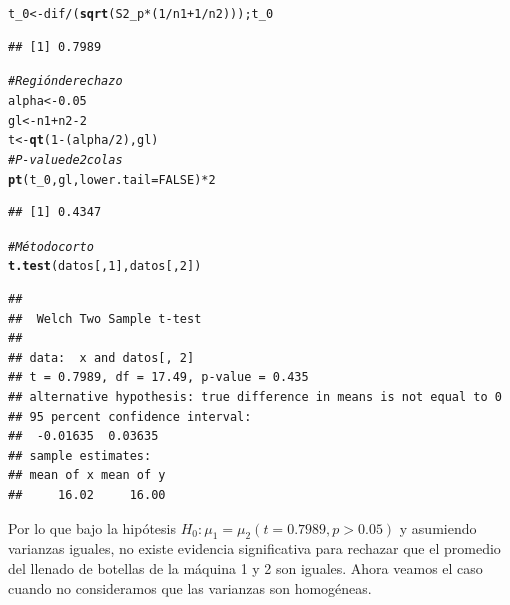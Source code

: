 \documentclass[a4paper]{scrartcl}\usepackage[]{graphicx}\usepackage[]{color}
\makeatletter
\newcommand{\hlnum}[1]{\textcolor[rgb]{0.686,0.059,0.569}{#1}}%
\newcommand{\hlcom}[1]{\textcolor[rgb]{0.678,0.584,0.686}{\textit{#1}}}%
\newcommand{\hlopt}[1]{\textcolor[rgb]{0,0,0}{#1}}%
\newcommand{\hlstd}[1]{\textcolor[rgb]{0.345,0.345,0.345}{#1}}%
\newcommand{\hlkwb}[1]{\textcolor[rgb]{0.69,0.353,0.396}{#1}}%
\newcommand{\hlkwc}[1]{\textcolor[rgb]{0.333,0.667,0.333}{#1}}%
\newcommand{\hlkwd}[1]{\textcolor[rgb]{0.737,0.353,0.396}{\textbf{#1}}}%
\newenvironment{kframe}{%
 \def\at@end@of@kframe{}%
 \ifinner\ifhmode%
  \def\at@end@of@kframe{\end{minipage}}%
  \begin{minipage}{\columnwidth}%
 \fi\fi%
 \def\FrameCommand##1{\hskip\@totalleftmargin \hskip-\fboxsep
 \colorbox{shadecolor}{##1}\hskip-\fboxsep
     \hskip-\linewidth \hskip-\@totalleftmargin \hskip\columnwidth}%
 \MakeFramed {\advance\hsize-\width
   \@totalleftmargin\z@ \linewidth\hsize
   \@setminipage}}%
 {\par\unskip\endMakeFramed%
 \at@end@of@kframe}
\newenvironment{knitrout}{}{} %
\makeatother
\begin{document}
\begin{knitrout}
\begin{kframe}
\begin{alltt}
\hlstd{t_0} \hlkwb{<-} \hlstd{dif}\hlopt{/}\hlstd{(}\hlkwd{sqrt}\hlstd{(S2_p}\hlopt{*}\hlstd{(}\hlnum{1}\hlopt{/}\hlstd{n1} \hlopt{+} \hlnum{1}\hlopt{/}\hlstd{n2))); t_0}
\end{alltt}
\begin{verbatim}
## [1] 0.7989
\end{verbatim}
\begin{alltt}
\hlcom{# Región de rechazo}
\hlstd{alpha} \hlkwb{<-} \hlnum{0.05}
\hlstd{gl} \hlkwb{<-} \hlstd{n1} \hlopt{+} \hlstd{n2} \hlopt{-} \hlnum{2}
\hlstd{t} \hlkwb{<-} \hlkwd{qt}\hlstd{(}\hlnum{1} \hlopt{-} \hlstd{(alpha}\hlopt{/}\hlnum{2}\hlstd{), gl)}
\hlcom{# P-value de 2 colas}
\hlkwd{pt}\hlstd{(t_0, gl,} \hlkwc{lower.tail} \hlstd{=} \hlnum{FALSE}\hlstd{)} \hlopt{*} \hlnum{2}
\end{alltt}
\begin{verbatim}
## [1] 0.4347
\end{verbatim}
\begin{alltt}
\hlcom{# Método corto}
\hlkwd{t.test}\hlstd{(datos[,} \hlnum{1}\hlstd{], datos[,} \hlnum{2}\hlstd{])}
\end{alltt}
\begin{verbatim}
## 
## 	Welch Two Sample t-test
## 
## data:  x and datos[, 2]
## t = 0.7989, df = 17.49, p-value = 0.435
## alternative hypothesis: true difference in means is not equal to 0
## 95 percent confidence interval:
##  -0.01635  0.03635
## sample estimates:
## mean of x mean of y 
##     16.02     16.00
\end{verbatim}
\end{kframe}
\end{knitrout}

\noindent Por lo que bajo la hipótesis $H_0: \mu_1 = \mu_2 (t= 0.7989,p>0.05)$ y asumiendo varianzas iguales, no existe evidencia significativa para rechazar que el promedio del llenado de botellas de la máquina 1 y 2 son iguales. Ahora veamos el caso cuando no consideramos que las varianzas son homogéneas.

\newpage
\end{document}

